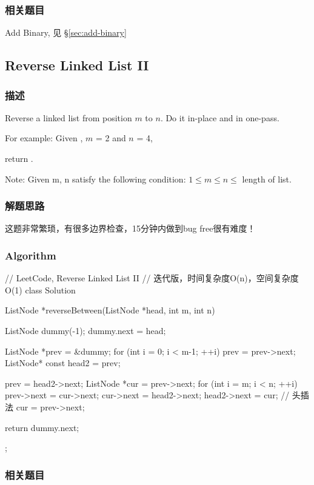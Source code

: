 \subsubsection{相关题目}

\begindot
\item Add Binary, 见 \S \ref{sec:add-binary}
\myenddot


\subsection{Reverse Linked List II}
\label{sec:reverse-linked-list-ii}


\subsubsection{描述}
Reverse a linked list from position $m$ to $n$. Do it in-place and in one-pass.

For example:
Given , $m$ = 2 and $n$ = 4,

return .

Note:
Given m, n satisfy the following condition:
$1 \leq m \leq  n \leq $ length of list.


\subsubsection{解题思路}
这题非常繁琐，有很多边界检查，15分钟内做到bug free很有难度！


\subsubsection{Algorithm}
\begin{Code}
	// LeetCode, Reverse Linked List II
	// 迭代版，时间复杂度O(n)，空间复杂度O(1)
	class Solution {
		ListNode *reverseBetween(ListNode *head, int m, int n) {
			ListNode dummy(-1);
			dummy.next = head;
			
			ListNode *prev = &dummy;
			for (int i = 0; i < m-1; ++i)
				prev = prev->next;
			ListNode* const head2 = prev;
			
			prev = head2->next;
			ListNode *cur = prev->next;
			for (int i = m; i < n; ++i) {
				prev->next = cur->next;
				cur->next = head2->next;
				head2->next = cur;  // 头插法
				cur = prev->next;
			}
			
			return dummy.next;
		}
	};
\end{Code}


\subsubsection{相关题目}

